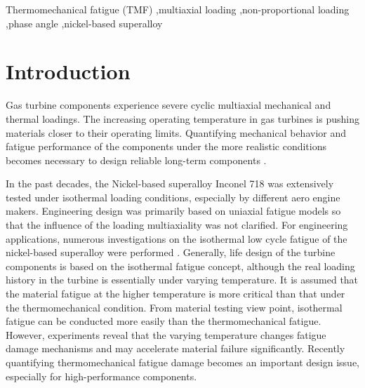 \documentclass[preprint,5p,twocolumn,11pt,sort&compress]{elsarticle}
\begin{document}
\begin{frontmatter}
\begin{abstract}
\end{abstract}

%
\begin{keyword}
Thermomechanical fatigue (TMF) \sep multiaxial loading \sep non-proportional loading \sep phase angle \sep nickel-based superalloy

\end{keyword}
\end{frontmatter}

\section{Introduction}
Gas turbine components experience severe cyclic multiaxial mechanical and thermal loadings. The increasing operating temperature in gas turbines is pushing materials closer to their operating limits. Quantifying mechanical behavior and fatigue performance of the components under the more realistic conditions becomes necessary to design reliable long-term components  \cite{Harrison1996}.

In the past decades, the Nickel-based superalloy Inconel 718 was extensively tested under isothermal loading conditions, especially by different aero engine makers. Engineering design was primarily based on uniaxial fatigue models so that the influence of the loading multiaxiality was not clarified.
 For engineering applications, numerous investigations on the isothermal low cycle fatigue of the nickel-based superalloy were performed \cite{Koch85, Morrow88, Mahobia2014, Chen2016, William1995, kim1988elevated, nelson1992creep}. 
Generally, life design of the turbine components is based on the isothermal fatigue concept, although the real loading history in the turbine is essentially under varying temperature. It is assumed that the material fatigue at the higher temperature is more critical than that under the thermomechanical condition. From material testing view point, isothermal fatigue can be conducted more easily than the thermomechanical fatigue. However, experiments reveal that the varying temperature changes fatigue damage mechanisms and may accelerate material failure significantly. Recently quantifying thermomechanical fatigue damage becomes an important design issue, especially for high-performance components.
\end{document}
